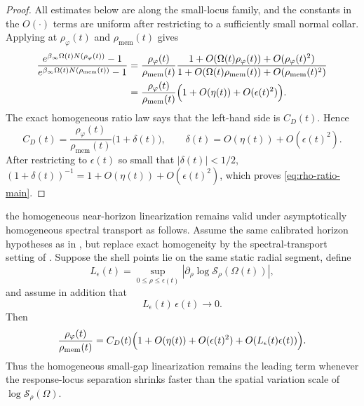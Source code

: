 \begin{proof}
All estimates below are along the small-locus family, and the constants in the
$O(\cdot)$ terms are uniform after restricting to a sufficiently small normal
collar. Applying  at
$\rho_\varphi(t)$ and $\rho_{\mathrm{mem}}(t)$ gives
\[
\begin{aligned}
\frac{e^{\beta_\infty\Omega(t) N(\rho_\varphi(t))}-1}
     {e^{\beta_\infty\Omega(t) N(\rho_{\mathrm{mem}}(t))}-1}
&=
\frac{\rho_\varphi(t)}{\rho_{\mathrm{mem}}(t)}
\frac{1+O(\Omega(t)\rho_\varphi(t))+O(\rho_\varphi(t)^2)}
     {1+O(\Omega(t)\rho_{\mathrm{mem}}(t))+O(\rho_{\mathrm{mem}}(t)^2)}  \\
&=
\frac{\rho_\varphi(t)}{\rho_{\mathrm{mem}}(t)}
\Bigl(1+O(\eta(t))+O(\epsilon(t)^2)\Bigr).
\end{aligned}
\]
The exact homogeneous ratio law says that the left-hand side is $C_D(t)$.
Hence
\[
C_D(t)=
\frac{\rho_\varphi(t)}{\rho_{\mathrm{mem}}(t)}
\bigl(1+\delta(t)\bigr),
\qquad
\delta(t)=O(\eta(t))+O(\epsilon(t)^2).
\]
After restricting to $\epsilon(t)$ so small that $|\delta(t)|<1/2$,
$(1+\delta(t))^{-1}=1+O(\eta(t))+O(\epsilon(t)^2)$, which proves
\eqref{eq:rho-ratio-main}.
\end{proof}

\begin{corollary}\label{cor:asymptotic-horizon-main}
\ModelAClause the homogeneous near-horizon
linearization remains valid under asymptotically homogeneous spectral
transport as follows.
Assume the same
calibrated horizon hypotheses as in , but replace exact
homogeneity by the
spectral-transport setting of . Suppose the
shell points lie on the same static radial segment, define
\[
L_\epsilon(t)=\sup_{0\le \rho\le \epsilon(t)}
\left|\partial_\rho \log \mathcal S_\rho(\Omega(t))\right|,
\]
and assume in addition that
\[
L_\epsilon(t)\,\epsilon(t)\longrightarrow0 .
\]
Then
\begin{equation}\label{eq:asymptotic-rho-ratio-main}
\frac{\rho_{\varphi}(t)}{\rho_{\mathrm{mem}}(t)}
=
C_D(t)\Bigl(1+O(\eta(t))+O(\epsilon(t)^2)+O(L_\epsilon(t)\epsilon(t))\Bigr).
\end{equation}
Thus the homogeneous small-gap linearization remains the leading term whenever
the response-locus separation shrinks faster than the spatial variation scale of
$\log \mathcal S_\rho(\Omega)$.
\end{corollary}

